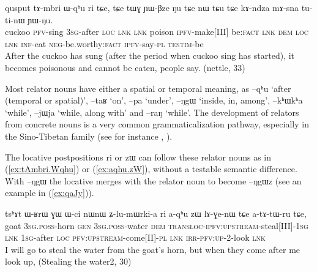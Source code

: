 \documentclass[oldfontcommands,oneside,a4paper,11pt]{article}
\newcommand{\ipa}[1]{{\phon \mbox{#1}}} %
\newcommand{\refb}[1]{(\ref{#1})}
\begin{document}
 \begin{exe}
\ex \label{ex:tAmbri.Wqhu} 
\gll 
\ipa{qusput}  	\ipa{tɤ-mbri}  	\ipa{ɯ-qʰu}  	\ipa{ri}  	\ipa{tɕe,}  	\ipa{tɕe}  	\ipa{tɯɣ}  	\ipa{ɲɯ-βze}  	\ipa{ŋu}  	\ipa{tɕe}  	\ipa{nɯ} \ipa{tɕu}  	\ipa{tɕe}  	\ipa{kɤ-ndza}  	\ipa{mɤ-sna}  	\ipa{tu-ti-nɯ}  	\ipa{ɲɯ-ŋu.}  \\
cuckoo \textsc{pfv}-sing \textsc{3sg}-after \textsc{loc} \textsc{lnk} \textsc{lnk} poison \textsc{ipfv}-make[III] be:\textsc{fact} \textsc{lnk}  \textsc{dem} \textsc{loc} \textsc{lnk} \textsc{inf}-eat \textsc{neg-}be.worthy:\textsc{fact} \textsc{ipfv}-say-\textsc{pl} \textsc{testim}-be \\
\glt After the cuckoo has sung (after the period when cuckoo sing has started), it becomes poisonous and cannot be eaten, people say. (nettle, 33)
\end{exe}

Most relator nouns have either a spatial or temporal meaning, as \ipa{--qʰu} `after (temporal or spatial)',  \ipa{--taʁ} `on',  \ipa{--pa} `under',  \ipa{--ŋgɯ} `inside, in, among', \ipa{--kʰɯkʰa} `while', \ipa{--jɯja} `while, along with' and \ipa{--raŋ} `while'. The development of relators from concrete nouns is a very common grammaticalization pathway, especially in the Sino-Tibetan family (see for instance \citealt{delancey97relator}, \citealt[184]{coupe07mongsen}).

The locative postpositions \ipa{ri} or \ipa{zɯ} can follow these relator nouns as in \refb{ex:tAmbri.Wqhu}  or \refb{ex:aqhu.zW}, without a testable semantic difference. With \ipa{--ŋgɯ} the  locative merges with the relator noun to  become \ipa{--ŋgɯz} (see an example in \refb{ex:qaJy}).

 \begin{exe}
\ex \label{ex:aqhu.zW} 
\gll
\ipa{tsʰɤt}  	\ipa{ɯ-ʁrɯ}  	\ipa{ɣɯ}  	\ipa{ɯ-ci}  	\ipa{nɯnɯ}  	\ipa{ʑ-lu-mɯrki-a}  	\ipa{ri}  	\ipa{a-qʰu}  	\ipa{zɯ}  	\ipa{lɤ-ɣe-nɯ}  	\ipa{tɕe}  \ipa{a-tɤ-tɯ-ru}  	\ipa{tɕe,}  \\
goat \textsc{3sg.poss}-horn \textsc{gen} \textsc{3sg.poss}-water \textsc{dem}  \textsc{transloc-ipfv:upstream}-steal[III]-\textsc{1sg} \textsc{lnk} \textsc{1sg}-after \textsc{loc} \textsc{pfv:upstream}-come[II]-\textsc{pl} \textsc{lnk} \textsc{irr-pfv:up}-2-look \textsc{lnk} \\
\glt I will go to steal the water from the goat's horn, but when they come after me look up, (Stealing the water2, 30)
\end{exe}
\end{document}
